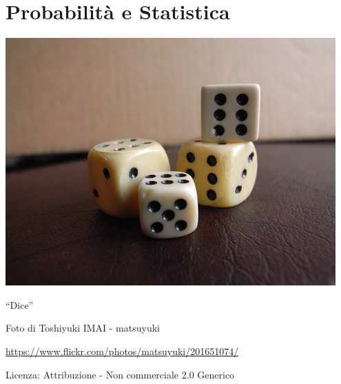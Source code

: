 \part{Probabilità e Statistica}

\includegraphics[width=0.95\textwidth]{img/dadi.jpg}
  \begin{center}
    {\large ``Dice''}\par
    Foto di Toshiyuki IMAI - matsuyuki\par
    \url{https://www.flickr.com/photos/matsuyuki/201651074/}\par
    Licenza: Attribuzione - Non commerciale 2.0 Generico\par
  \end{center}
\clearpage
\cleardoublepage
